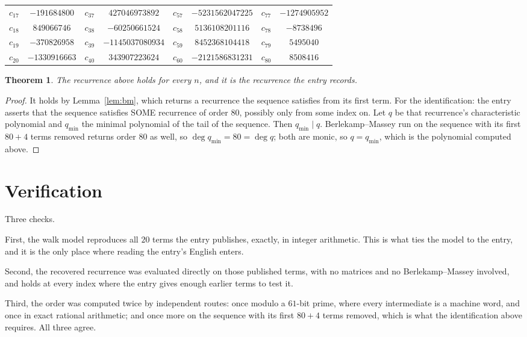 \documentclass[11pt,a4paper]{article}
\theoremstyle{plain}
\newtheorem{theorem}{Theorem}
\theoremstyle{definition}
\begin{document}
\begin{center}
\begin{tabular}{cccccccc}
$c_{17}$ & $-191684800$ & $c_{37}$ & $427046973892$ & $c_{57}$ & $-5231562047225$ & $c_{77}$ & $-1274905952$ \\
$c_{18}$ & $849066746$ & $c_{38}$ & $-60250661524$ & $c_{58}$ & $5136108201116$ & $c_{78}$ & $-8738496$ \\
$c_{19}$ & $-370826958$ & $c_{39}$ & $-1145037080934$ & $c_{59}$ & $8452368104418$ & $c_{79}$ & $5495040$ \\
$c_{20}$ & $-1330916663$ & $c_{40}$ & $343907223624$ & $c_{60}$ & $-2121586831231$ & $c_{80}$ & $8508416$ \\
\end{tabular}
\end{center}

\begin{theorem}
The recurrence above holds for every $n$, and it is the recurrence the entry records.
\end{theorem}

\begin{proof}
It holds by Lemma~\ref{lem:bm}, which returns a recurrence the sequence satisfies from its
first term. For the identification: the entry asserts that the sequence satisfies SOME
recurrence of order $80$, possibly only from some index on. Let $q$ be that recurrence's
characteristic polynomial and $q_{\min}$ the minimal polynomial of the tail of the sequence.
Then $q_{\min}\mid q$. Berlekamp--Massey run on the sequence with its first $80+4$ terms
removed returns order $80$ as well, so $\deg q_{\min}=80=\deg q$; both are monic, so
$q=q_{\min}$, which is the polynomial computed above.
\end{proof}

\section{Verification}

Three checks.

First, the walk model reproduces all $20$ terms the entry publishes, exactly, in integer
arithmetic. This is what ties the model to the entry, and it is the only place where reading
the entry's English enters.

Second, the recovered recurrence was evaluated directly on those published terms, with no
matrices and no Berlekamp--Massey involved, and holds at every index where the entry gives
enough earlier terms to test it.

Third, the order was computed twice by independent routes: once modulo a $61$-bit prime, where
every intermediate is a machine word, and once in exact rational arithmetic; and once more on
the sequence with its first $80+4$ terms removed, which is what the identification above
requires. All three agree.
\end{document}

